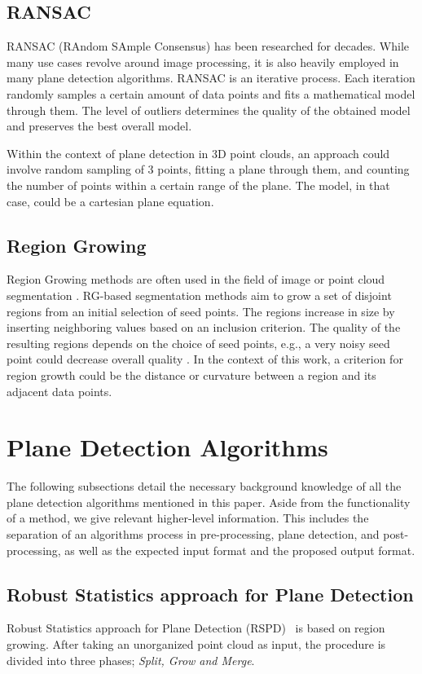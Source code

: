 \documentclass[main.tex]{subfiles}
\begin{document}
\subsection*{RANSAC}
RANSAC (RAndom SAmple Consensus) has been researched for decades. While many use cases revolve around image processing, it is also heavily employed in many plane detection algorithms\cite{Sun_Mordohai_2019, Yang_Forstner, Ashraf_Ahmed_2017}.
RANSAC is an iterative process. Each iteration randomly samples a certain amount of data points and fits a mathematical model through them. The level of outliers determines the quality of the obtained model and preserves the best overall model.

Within the context of plane detection in 3D point clouds, an approach could involve random sampling of 3 points, fitting a plane through them,
and counting the number of points within a certain range of the plane\cite{Yang_Forstner}. The model, in that case, could be a cartesian plane equation.

\subsection*{Region Growing}
Region Growing methods are often used in the field of image or point cloud segmentation \cite{Proença_Gao_2018, Vo_Truong-Hong_Laefer_Bertolotto_2015}.
RG-based segmentation methods aim to grow a set of disjoint regions from an initial selection of seed points. The regions increase in size by inserting neighboring values based on an inclusion criterion.
The quality of the resulting regions depends on the choice of seed points, e.g., a very noisy seed point could decrease overall quality  \cite{Malek_Rahman_Yasiran_Jumaat_Jalil_2012}.
In the context of this work, a criterion for region growth could be the distance or curvature between a region and its adjacent data points.

\section{Plane Detection Algorithms}
The following subsections detail the necessary background knowledge of all the plane detection algorithms mentioned in this paper.
Aside from the functionality of a method, we give relevant higher-level information. This includes the separation of an algorithms 
process in pre-processing, plane detection, and post-processing, as well as the expected input format and the proposed output format.
 

\subsection{Robust Statistics approach for Plane Detection}
Robust Statistics approach for Plane Detection (RSPD)~\cite{Araújo_Oliveira_2020} is based on region growing. After taking an unorganized point cloud as input, the procedure is divided into three phases;
\textit{Split, Grow and Merge}.
\end{document}
